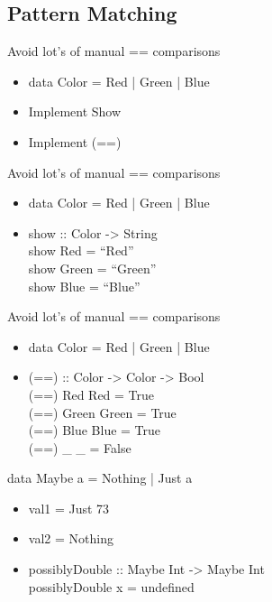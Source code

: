 \documentclass{beamer}                  %
\newcommand{\srule}{
	\rule{\textwidth}{1pt}\\
}
\newlength{\subsecwidth}
\newenvironment{slide}{
	\begin{frame} %
	\settowidth{\subsecwidth}{\insertsubsection} %
	\ifthenelse{\dimtest{\subsecwidth}{<}{1pt}}{ %
		\frametitle{\insertsection\\             %
		\vspace{-1ex}                            %
		\color{fore}\srule                       %
		\par                                     %
		\vspace{-3ex}                            %
		}
	}{                                           %
		\frametitle{\insertsection\ -- \insertsubsection\\ %
		\vspace{-1ex}                            %
		\color{fore}\srule                       %
		\par                                     %
		\vspace{-3ex}                            %
		}
	}
	\Large                                       %
}{
	\end{frame}
}
\begin{document}
\subsection{Pattern Matching}
\begin{slide}
  Avoid lot's of manual == comparisons
  \begin{itemize}
    \item data Color = Red | Green | Blue
    \item Implement Show
    \item Implement (==)
  \end{itemize}
\end{slide}

\begin{slide}
  Avoid lot's of manual == comparisons
  \begin{itemize}
    \item data Color = Red | Green | Blue
      \item
        show :: Color -> String\\
        show Red = ``Red''\\
        show Green = ``Green''\\
        show Blue = ``Blue''
  \end{itemize}
\end{slide}

\begin{slide}
  Avoid lot's of manual == comparisons
  \begin{itemize}
    \item data Color = Red | Green | Blue
    \item
        (==) :: Color -> Color -> Bool\\
        (==) Red Red     = True\\
        (==) Green Green = True\\
        (==) Blue Blue   = True\\
        (==) \_ \_         = False
  \end{itemize}
\end{slide}

\begin{slide}
  data Maybe a = Nothing | Just a
  \begin{itemize}
    \item val1 = Just 73
    \item val2 = Nothing
    \item possiblyDouble :: Maybe Int -> Maybe Int\\
      possiblyDouble x = undefined
  \end{itemize}
\end{slide}
\end{document}
